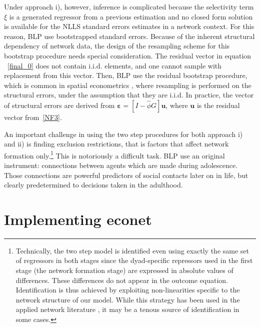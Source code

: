 \documentclass[nojss]{jss}
\begin{document}
Under approach i), however, inference is complicated because the
selectivity term $\xi$ is a generated regressor from a previous estimation and no closed form solution is available for the NLLS standard errors estimates in a network context. For this reason, BLP use bootstrapped standard errors. Because of the inherent structural dependency of network data, the design of the resampling scheme for this bootstrap procedure needs special consideration. The residual vector in equation ~\ref{final_0} does not contain i.i.d. elements, and one cannot sample with replacement from this vector. Then, BLP use the residual bootstrap procedure, which is common in spatial econometrics \citep[see][]{Anselin:1990}, where resampling is performed on the structural errors, under the assumption that they are i.i.d. In practice, the vector of structural errors are derived from $\mathbf{\varepsilon}=[I-\widehat{\phi}G]\boldsymbol{u}$, where $\boldsymbol{u}$ is the residual vector from~\ref{NF3}.

An important challenge in using the two step procedures for both approach i) and ii) is finding exclusion restrictions, that is factors that affect network formation only.\footnote{Technically, the two step model is identified even using exactly the same set of regressors in both stages since the dyad-specific repressors used in the first stage (the network formation stage) are expressed in absolute values of differences. These differences do not appear in the outcome equation. Identification is thus achieved by exploiting non-linearities specific to the network structure of our model. While this strategy has been used in the applied network literature \citep[see e.g.,][]{GPI:2013,CSL:2016}, it may be a tenous source of identification in some cases.} This is notoriously a difficult task. BLP use an original instrument: connections between agents which are made during adolescence. Those connections are powerful predictors of social contacts later on in life, but clearly predetermined to decisions taken in the adulthood.

\section{Implementing econet}\label{sec:econet}
\end{document}
